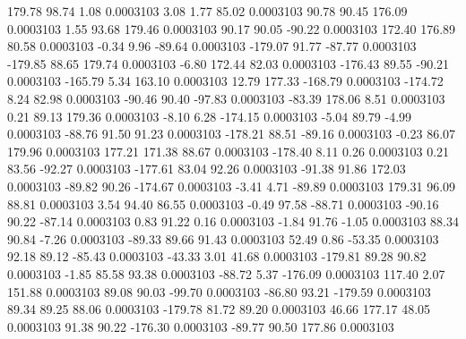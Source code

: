       179.78       98.74        1.08     0.0003103
        3.08        1.77       85.02     0.0003103
       90.78       90.45      176.09     0.0003103
        1.55       93.68      179.46     0.0003103
       90.17       90.05      -90.22     0.0003103
      172.40      176.89       80.58     0.0003103
       -0.34        9.96      -89.64     0.0003103
     -179.07       91.77      -87.77     0.0003103
     -179.85       88.65      179.74     0.0003103
       -6.80      172.44       82.03     0.0003103
     -176.43       89.55      -90.21     0.0003103
     -165.79        5.34      163.10     0.0003103
       12.79      177.33     -168.79     0.0003103
     -174.72        8.24       82.98     0.0003103
      -90.46       90.40      -97.83     0.0003103
      -83.39      178.06        8.51     0.0003103
        0.21       89.13      179.36     0.0003103
       -8.10        6.28     -174.15     0.0003103
       -5.04       89.79       -4.99     0.0003103
      -88.76       91.50       91.23     0.0003103
     -178.21       88.51      -89.16     0.0003103
       -0.23       86.07      179.96     0.0003103
      177.21      171.38       88.67     0.0003103
     -178.40        8.11        0.26     0.0003103
        0.21       83.56      -92.27     0.0003103
     -177.61       83.04       92.26     0.0003103
      -91.38       91.86      172.03     0.0003103
      -89.82       90.26     -174.67     0.0003103
       -3.41        4.71      -89.89     0.0003103
      179.31       96.09       88.81     0.0003103
        3.54       94.40       86.55     0.0003103
       -0.49       97.58      -88.71     0.0003103
      -90.16       90.22      -87.14     0.0003103
        0.83       91.22        0.16     0.0003103
       -1.84       91.76       -1.05     0.0003103
       88.34       90.84       -7.26     0.0003103
      -89.33       89.66       91.43     0.0003103
       52.49        0.86      -53.35     0.0003103
       92.18       89.12      -85.43     0.0003103
      -43.33        3.01       41.68     0.0003103
     -179.81       89.28       90.82     0.0003103
       -1.85       85.58       93.38     0.0003103
      -88.72        5.37     -176.09     0.0003103
      117.40        2.07      151.88     0.0003103
       89.08       90.03      -99.70     0.0003103
      -86.80       93.21     -179.59     0.0003103
       89.34       89.25       88.06     0.0003103
     -179.78       81.72       89.20     0.0003103
       46.66      177.17       48.05     0.0003103
       91.38       90.22     -176.30     0.0003103
      -89.77       90.50      177.86     0.0003103
